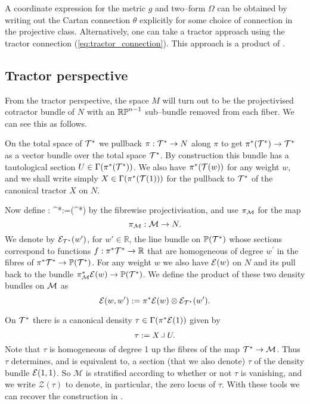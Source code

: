 A coordinate expression for the metric $g$ and two--form $\Omega$ can be obtained by writing out the Cartan connection $\theta$ explicitly for some choice of connection in the projective class. Alternatively, one can take a tractor approach using the tractor connection (\ref{eq:tractor_connection}). This approach is a product of \cite{DGW}.

\subsection{Tractor perspective}

From the tractor perspective, the space $M$ will turn out to be the projectivised cotractor bundle of $N$ with an $\mathbb{RP}^{n-1}$ sub--bundle removed from each fiber. We can see this as follows.

On the total space of $\mathcal{T}^*$ we pullback $\pi:\mathcal{T}^*\to N$ along $\pi$ to get $\pi^*(\mathcal{T}^*)\to \mathcal{T}^*$ as a vector bundle over the total space $\mathcal{T}^*$. By construction this bundle has a tautological section $U\in \Gamma (\pi^*(\mathcal{T}^*))$.  We also have $\pi^*(\mathcal{T}(w))$ for any weight $w$, and we shall write simply $X\in \Gamma(\pi^*(\mathcal{T}(1)))$ for the pullback to $\mathcal{T}^*$ of the canonical tractor $X$ on $N$.

Now define
\be
\label{projection_map}
\kappa: \cT^*\longrightarrow {}:=(\cT^*)
\ee
by the fibrewise projectivisation, and use $\pi_{\mathcal{M}}$ for the map
$$
\pi_{\mathcal{M}}:\mathcal{M}\to N.
$$
We denote by $\mathcal{E}_{\mathcal{T}^*}(w')$, for $w'\in \mathbb{R}$, the line
bundle on $\mathbb{P}(\mathcal{T}^*)$ whose sections correspond to functions
$f: \pi^*\mathcal{T}^* \to\mathbb{R} $ that are homogeneous of degree $w^\prime$ in
the fibres of $\pi^*\mathcal{T}^*\to \mathbb{P}(\mathcal{T}^*)$. For any weight $w$ we also have $\mathcal{E}(w)$ on $N$ and its pull back to the bundle $\pi_{\mathcal{M}}^*\mathcal{E}(w)\to \mathbb{P}(\mathcal{T}^*)$.
We define the product of these two density bundles on $\mathcal{M}$ as
$$
\mathcal{E}(w,w'):= \pi^*\mathcal{E}(w) \otimes \mathcal{E}_{\mathcal{T}^*}(w').
$$

On $\mathcal{T}^*$ there is  a canonical density $\tau\in \Gamma(\pi^*\mathcal{E}(1))$ given by
$$
\tau:= X\hook U .
$$
Note that $\tau$ is homogeneous of degree 1 up the fibres of the
map $\mathcal{T}^*\to \mathcal{M}$. Thus $\tau$ determines, and is equivalent
to, a section (that we also denote) $\tau$ of the density bundle $\mathcal{E}(1,1)$. So $\mathcal{M}$ is stratified according to
whether or not $\tau$ is vanishing, and we write $\mathcal{Z}(\tau)$
to denote, in particular, the zero locus of $\tau$. With these tools we can recover the construction in \cite{DM}.

